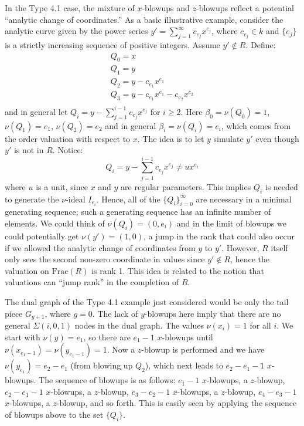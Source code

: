 \documentclass[11pt]{amsart}
\theoremstyle{definition}
\begin{document}
{In the Type 4.1 case, the mixture of $x$-blowups and $z$-blowups reflect a potential ``analytic change of coordinates.'' As a basic illustrative example, consider the analytic curve given by the power series $\displaystyle y'=\sum_{j=1}^{\infty} c_{e_j}x^{e_j}$, where $c_{e_j}\in k$ and $\{e_j\}$ is a strictly increasing sequence of positive integers. Assume $y'\notin R$. Define:
\begin{equation*}
\begin{array}{l}
Q_0=x \\
Q_1=y \\
\displaystyle Q_2=y-c_{e_1}x^{e_1} \\
\displaystyle Q_3=y-c_{e_1}x^{e_1}-c_{e_2}x^{e_2} \\
\end{array}
\end{equation*}
and in general let $\displaystyle Q_i=y-\sum_{j=1}^{i-1}c_{e_j}x^{e_j}$ for $i\geq 2$. Here $\beta_0=\nu(Q_0)=1$, $\nu(Q_1)=e_1$, $\nu(Q_2)=e_2$ and in general $\beta_i=\nu(Q_i)=e_i$, which comes from the order valuation with respect to $x$. The idea is to let $y$ simulate $y'$ even though $y'$ is not in $R$. Notice:
\begin{equation*}
Q_i=y-\sum_{j=1}^{i-1} c_{e_j}x^{e_j} \neq u x^{e_i}
\end{equation*}
where $u$ is a unit, since $x$ and $y$ are regular parameters. This implies $Q_i$ is needed to generate the $\nu$-ideal $\displaystyle I_{e_i}$. Hence, all of the $\{Q_i\}_{i=0}^{\infty}$ are necessary in a minimal generating sequence; such a generating sequence has an infinite number of elements. We could think of $\nu(Q_i)=(0,e_i)$ and in the limit of blowups we could potentially get $\nu(y')=(1,0)$, a jump in the rank that could also occur if we allowed the analytic change of coordinates from $y$ to $y'$. However, $R$ itself only sees the second non-zero coordinate in values since $y'\notin R$, hence the valuation on $\text{Frac}(R)$ is rank 1. This idea is related to the notion that valuations can ``jump rank'' in the completion of $R$.

The dual graph of the Type 4.1 example just considered would be only the tail piece $G_{g+1}$, where $g=0$. The lack of $y$-blowups here imply that there are no general $\Sigma(i,0,1)$ nodes in the dual graph. The values $\nu(x_i)=1$ for all $i$. We start with $\nu(y)=e_1$, so there are $e_1-1$ $x$-blowups until $\nu(x_{e_1-1})=\nu(y_{e_1-1})=1$. Now a $z$-blowup is performed and we have $\nu(y_{e_1})=e_2-e_1$ (from blowing up $Q_2$), which next leads to $e_2-e_1-1$ $x$-blowups. The sequence of blowups is as follows: $e_1-1$ $x$-blowups, a $z$-blowup, $e_2-e_1-1$ $x$-blowups, a $z$-blowup, $e_3-e_2-1$ $x$-blowups, a $z$-blowup, $e_4-e_3-1$ $x$-blowups, a $z$-blowup, and so forth. This is easily seen by applying the sequence of blowups above to the set $\{Q_i\}$.

}
\end{document}
